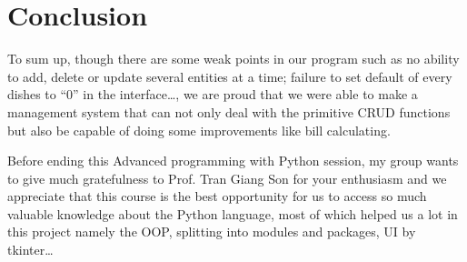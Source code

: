 \newpage
\section{Conclusion}
\hspace{0.7cm} To sum up, though there are some weak points in our program such as no ability to add, delete or update several entities at a time; failure to set default of every dishes to “0” in the interface…, we are proud that we were able to make a management system that can not only deal with the primitive CRUD functions but also be capable of doing some improvements like bill calculating.

Before ending this Advanced programming with Python session, my group wants to give much gratefulness to Prof. Tran Giang Son for your enthusiasm and we appreciate that this course is the best opportunity for us to access so much valuable knowledge about the Python language, most of which helped us a lot in this project namely the OOP, splitting into modules and packages, UI by tkinter…
